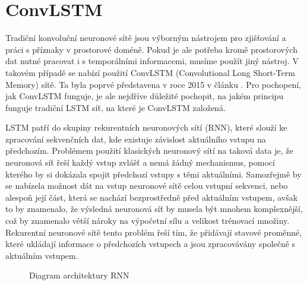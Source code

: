 \section{ConvLSTM}
Tradiční konvoluční neuronové sítě jsou výborným nástrojem pro zjišťování a práci s příznaky v prostorové doméně. Pokud je ale potřeba kromě prostorových dat nutné pracovat i s temporálními informacemi, musíme použít jiný nástroj. V takovém případě se nabízí použití ConvLSTM (Convolutional Long Short-Term Memory) sítě. Ta byla poprvé představena v roce 2015 v článku \cite{ConvLSTM}. Pro pochopení, jak ConvLSTM funguje, je ale nejdříve důležité pochopit, na jakém principu funguje tradiční LSTM síť, na které je ConvLSTM založená.

LSTM patří do skupiny rekurentních neuronových sítí (RNN), které slouží ke zpracování sekvenčních dat, kde existuje závislost aktuálního vstupu na předchozím.
Problémem použití klasických neuronový sítí na taková data je, že neuronová síť řeší každý vstup zvlášť a nemá žádný mechanismus, pomocí kterého by si dokázala spojit předchozí vstupy s těmi aktuálními.
Samozřejmě by se nabízela možnost dát na vstup neuronové sítě celou vstupní sekvenci, nebo alespoň její část, která se nachází bezprostředně před aktuálním vstupem, avšak to by znamenalo, že výsledná neuronová síť by musela být mnohem komplexnější, což by znamenalo větší nároky na výpočetní sílu a velikost trénovací množiny.
Rekurentní neuronové sítě tento problém řeší tím, že přidávají stavové proměnné, které ukládají informace o předchozích vstupech a jsou zpracovávány společně s aktuálním vstupem.

\begin{figure}[h!]
	\centering
	\caption{Diagram architektury RNN}
	\label{fig:RNN_architecture}
\end{figure}

